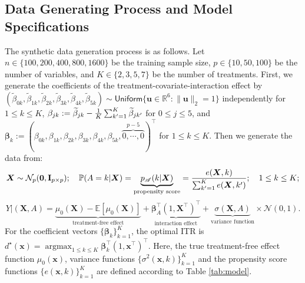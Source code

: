 \documentclass[11pt]{article}
\theoremstyle{definition}
\theoremstyle{remark}
\newcommand{\bu}{\bm{u}}
\newcommand{\bx}{\bm{x}}
\newcommand{\Ib}{\mathbf{I}}
\newcommand{\bX}{\bm{X}}
\newcommand{\bbeta}{\bm{\beta}}
\newcommand{\bbE}{\mathbb{E}}
\newcommand{\bbP}{\mathbb{P}}
\newcommand{\bbR}{\mathbb{R}}
\newcommand{\cN}{\mathcal{N}}
\newcommand{\sA}{\mathscr{A}}
\newcommand{\argmax}{\mathop{\mathrm{argmax}}}
\newcommand{\bzero}{\mathbf{0}}	%
\newcommand{\unif}{\mathsf{Uniform}}
\begin{document}
\subsection{Data Generating Process and Model Specifications}\label{sec:DGP}
The synthetic data generation process is as follows. Let $ n \in \{100,200,400,800,1600\} $ be the training sample size, $ p \in \{ 10,50,100 \} $ be the number of variables, and $ K \in \{2,3,5,7\} $ be the number of treatments. First, we generate the coefficients of the treatment-covariate-interaction effect by $ (\widetilde{\beta}_{0k},\widetilde{\beta}_{1k},\widetilde{\beta}_{2k},\widetilde{\beta}_{3k},\widetilde{\beta}_{4k},\widetilde{\beta}_{5k}) \sim \unif\{ \bu \in \bbR^{6}: \|\bu\|_{2} = 1 \} $ independently for $ 1 \le k \le K $, $ \beta_{jk} := \widetilde{\beta}_{jk} - {1 \over K}\sum_{k'=1}^{K}\widetilde{\beta}_{jk'} $ for $ 0 \le j \le 5 $, and $ \bbeta_{k} := (\beta_{0k},\beta_{1k},\beta_{2k},\beta_{3k},\beta_{4k},\beta_{5k},\overbrace{0,\cdots,0}^{p-5})^{\intercal} $ for $ 1 \le k \le K $. Then we generate the data from:
\[ \bX \sim \cN_{p}(\bzero,\Ib_{p\times p}); \quad \bbP(A=k|\bX) = \underbrace{p_{\sA}(k|\bX)}_{\text{propensity score}} = {e(\bX,k) \over \sum_{k'=1}^{K}e(\bX,k')}; \quad 1 \le k \le K; \]
\[ Y|(\bX,A) = \underbrace{\mu_{0}(\bX) - \bbE[\mu_{0}(\bX)]}_{\text{treatment-free effect}} + \underbrace{\bbeta_{A}^{\intercal}(1,\bX^{\intercal})^{\intercal}}_{\text{interaction effect}}+ \underbrace{\sigma(\bX,A)}_{\text{variance function}} \times \cN(0,1). \]
For the coefficient vectors $ \{\bbeta_{k}\}_{k=1}^{K} $, the optimal ITR is $ d^{\star}(\bx) = \argmax_{1 \le k \le K}\bbeta_{k}^{\intercal}(1,\bx^{\intercal})^{\intercal} $. Here, the true treatment-free effect function $ \mu_{0}(\bx) $, variance functions $ \{\sigma^{2}(\bx,k)\}_{k=1}^{K} $ and the propensity score functions $ \{ e(\bx,k) \}_{k=1}^{K} $ are defined according to Table \ref{tab:model}. 
\end{document}
